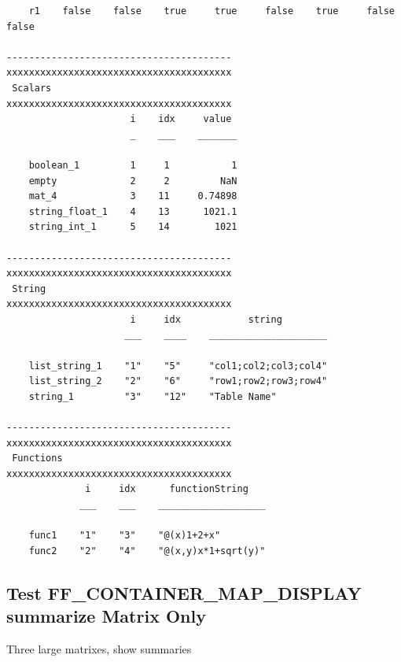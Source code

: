 \documentclass[
]{book}
\begin{document}
\begin{verbatim}
    r1    false    false    true     true     false    true     false    false

----------------------------------------
xxxxxxxxxxxxxxxxxxxxxxxxxxxxxxxxxxxxxxxx
 Scalars
xxxxxxxxxxxxxxxxxxxxxxxxxxxxxxxxxxxxxxxx
                      i    idx     value 
                      _    ___    _______

    boolean_1         1     1           1
    empty             2     2         NaN
    mat_4             3    11     0.74898
    string_float_1    4    13      1021.1
    string_int_1      5    14        1021

----------------------------------------
xxxxxxxxxxxxxxxxxxxxxxxxxxxxxxxxxxxxxxxx
 String
xxxxxxxxxxxxxxxxxxxxxxxxxxxxxxxxxxxxxxxx
                      i     idx            string        
                     ___    ____    _____________________

    list_string_1    "1"    "5"     "col1;col2;col3;col4"
    list_string_2    "2"    "6"     "row1;row2;row3;row4"
    string_1         "3"    "12"    "Table Name"         

----------------------------------------
xxxxxxxxxxxxxxxxxxxxxxxxxxxxxxxxxxxxxxxx
 Functions
xxxxxxxxxxxxxxxxxxxxxxxxxxxxxxxxxxxxxxxx
              i     idx      functionString   
             ___    ___    ___________________

    func1    "1"    "3"    "@(x)1+2+x"        
    func2    "2"    "4"    "@(x,y)x*1+sqrt(y)"
\end{verbatim}

\hypertarget{test-ff_container_map_display-summarize-matrix-only}{%
\subsection{Test FF\_CONTAINER\_MAP\_DISPLAY summarize Matrix Only}\label{test-ff_container_map_display-summarize-matrix-only}}

Three large matrixes, show summaries
\end{document}

